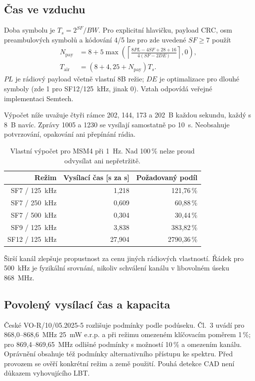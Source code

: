 \documentclass[11pt,a4paper]{article}
\begin{document}
\subsection{Čas ve vzduchu}
Doba symbolu je $T_s=2^{SF}/BW$. Pro explicitní hlavičku, payload CRC, osm preambulových symbolů a kódování 4/5 lze pro zde uvedené $SF\geq7$ použít
\begin{align}
 N_{\mathrm{pay}}&=8+5\max\left(
 \left\lceil\frac{8PL-4SF+28+16}{4(SF-2DE)}\right\rceil,0\right),\\
 T_{\mathrm{air}}&=(8+4{,}25+N_{\mathrm{pay}})T_s .
\end{align}
$PL$ je rádiový payload včetně vlastní 8B režie; $DE$ je optimalizace pro dlouhé symboly (zde 1 pro SF12/125~kHz, jinak 0). Vztah odpovídá veřejné implementaci Semtech.\cite{semtech}

Výpočet níže uvažuje čtyři rámce 202, 144, 173 a 202~B každou sekundu, každý s 8~B navíc. Zprávy 1005 a 1230 se vysílají samostatně po 10~s. Neobsahuje potvrzování, opakování ani přepínání rádia.
\par
\begin{table}[htbp]\centering\small
\caption{Vlastní výpočet pro MSM4 při 1~Hz. Nad 100\,\% nelze proud odvysílat ani nepřetržitě.}
\begin{tabular}{rrr}\toprule
Režim & Vysílací čas [s za s] & Požadovaný podíl\\\midrule
SF7 / 125~kHz & 1,218 & 121,76\,\%\\
SF7 / 250~kHz & 0,609 & 60,88\,\%\\
SF7 / 500~kHz & 0,304 & 30,44\,\%\\
SF9 / 125~kHz & 3,838 & 383,82\,\%\\
SF12 / 125~kHz & 27,904 & 2790,36\,\%\\
\bottomrule\end{tabular}\end{table}
\par
Širší kanál zlepšuje propustnost za cenu jiných rádiových vlastností. Řádek pro 500~kHz je fyzikální srovnání, nikoliv schválení kanálu v libovolném úseku 868~MHz.

\subsection{Povolený vysílací čas a kapacita}
České VO-R/10/05.2025-5 rozlišuje podmínky podle podúseku. Čl.~3 uvádí pro 868,0--868,6~MHz 25~mW e.r.p. a při režimu omezeném klíčovacím poměrem 1\,\%; pro 869,4--869,65~MHz odlišné podmínky s možností 10\,\% a omezením kanálu. Oprávnění obsahuje též podmínky alternativního přístupu ke spektru.\cite{ctu} Před provozem se ověří konkrétní režim a země použití. Pouhá detekce CAD není důkazem vyhovujícího LBT.
\end{document}
